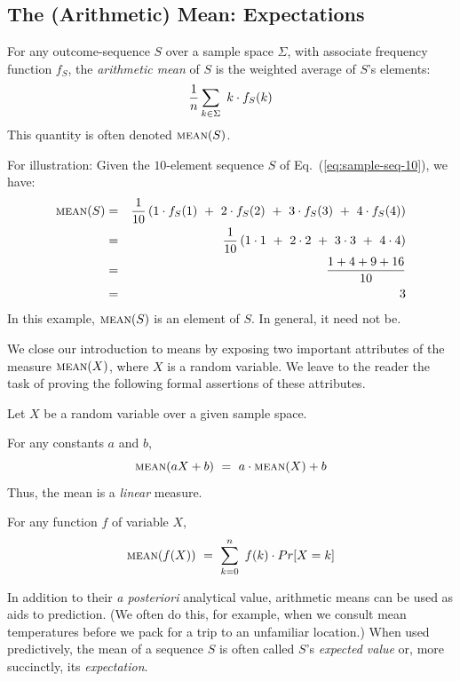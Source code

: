 \subsection{The (Arithmetic) Mean: Expectations}
\label{sec:mean}

   
For any outcome-sequence $S$ over a sample space $\Sigma$, with associate frequency function $f_S$, the {\it arithmetic mean} of $S$ is the weighted average of $S$'s elements:
\[ {1 \over n} \sum_{k \in \Sigma} \ k \cdot f_S(k) \]
This quantity is often denoted $\mbox{\sc mean}(S)$.  

\smallskip

For illustration: Given the $10$-element sequence $S$ of Eq.~(\ref{eq:sample-seq-10}), we have:
\begin{eqnarray*}
\mbox{\sc mean}(S) & = &
{1 \over 10} \left(1 \cdot f_S(1) \ + \ 2 \cdot f_S(2) \ + \ 3 \cdot f_S(3) \ + \ 4 \cdot f_S(4) \right) \\
 & = &
{1 \over 10} \left(1 \cdot 1 \ + \ 2 \cdot 2 \ + \ 3 \cdot 3 \ + \ 4 \cdot 4 \right) \\
 & = &
\frac{1 + 4 + 9 + 16}{10} \\
 & = & 3
\end{eqnarray*}
In this example, $\mbox{\sc mean}(S)$ is an element of $S$.  In general, it need not be.

\smallskip

We close our introduction to means by exposing two important attributes of the measure $\mbox{\sc mean}(X)$, where $X$ is a random variable.  We leave to the reader the task of proving the following formal assertions of these attributes.

\begin{prop} 
\label{thm:mean-linear}
Let $X$ be a random variable over a given sample space.

\smallskip

 For any constants $a$ and $b$,
\[ \mbox{\sc mean}(aX+b) \ = \ a \cdot \mbox{\sc mean}(X) + b  \]
Thus, the mean is a {\em linear} measure.

\medskip

 For any function $f$ of variable $X$,
\[ \mbox{\sc mean}(f(X)) \ = \ \sum_{k=0}^n \ f(k) \cdot Pr[X = k] \]
\end{prop}

\bigskip

In addition to their {\em a posteriori} analytical value, arithmetic means can be used as aids to prediction.  (We often do this, for example, when we consult mean temperatures before we pack for a trip to an unfamiliar location.)  When used predictively, the mean of a sequence $S$ is often called $S$'s {\it expected value} or, more succinctly, its {\it expectation}.
 

